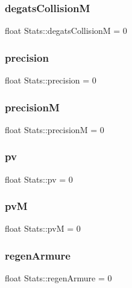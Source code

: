 \subsubsection{\texorpdfstring{degats\+CollisionM}{degatsCollisionM}}
{\footnotesize\ttfamily float Stats\+::degats\+CollisionM = 0}

\mbox{\label{struct_stats_a9bd47ff7ae57b729318962be171f904f}} 
\subsubsection{\texorpdfstring{precision}{precision}}
{\footnotesize\ttfamily float Stats\+::precision = 0}

\mbox{\label{struct_stats_a98960e492558ce2ce16ba26e31546185}} 
\subsubsection{\texorpdfstring{precisionM}{precisionM}}
{\footnotesize\ttfamily float Stats\+::precisionM = 0}

\mbox{\label{struct_stats_a2097f1a2792357774e944c923313f509}} 
\subsubsection{\texorpdfstring{pv}{pv}}
{\footnotesize\ttfamily float Stats\+::pv = 0}

\mbox{\label{struct_stats_aeab4629ec244a16aa0650f9116cb6617}} 
\subsubsection{\texorpdfstring{pvM}{pvM}}
{\footnotesize\ttfamily float Stats\+::pvM = 0}

\mbox{\label{struct_stats_aeedf1d750e5437ad0ff416e6acddd174}} 
\subsubsection{\texorpdfstring{regen\+Armure}{regenArmure}}
{\footnotesize\ttfamily float Stats\+::regen\+Armure = 0}

